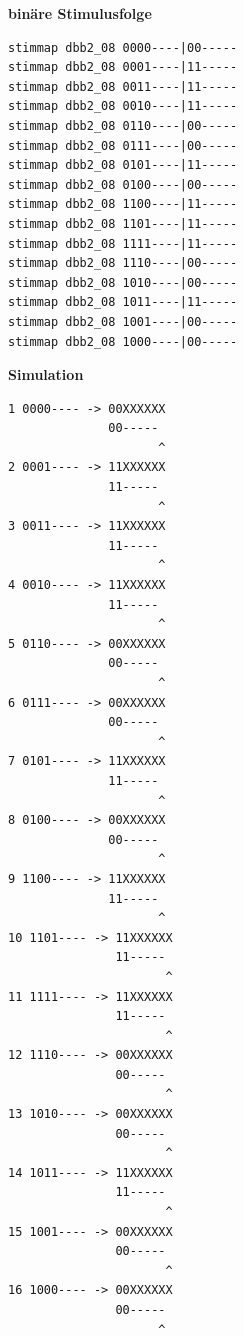 \documentclass[fleqn]{article}
\begin{document}
\textbf{binäre Stimulusfolge}
\begin{lstlisting}
stimmap dbb2_08 0000----|00-----
stimmap dbb2_08 0001----|11-----
stimmap dbb2_08 0011----|11-----
stimmap dbb2_08 0010----|11-----
stimmap dbb2_08 0110----|00-----
stimmap dbb2_08 0111----|00-----
stimmap dbb2_08 0101----|11-----
stimmap dbb2_08 0100----|00-----
stimmap dbb2_08 1100----|11-----
stimmap dbb2_08 1101----|11-----
stimmap dbb2_08 1111----|11-----
stimmap dbb2_08 1110----|00-----
stimmap dbb2_08 1010----|00-----
stimmap dbb2_08 1011----|11-----
stimmap dbb2_08 1001----|00-----
stimmap dbb2_08 1000----|00-----
\end{lstlisting}

\textbf{Simulation}
\begin{lstlisting}
1 0000---- -> 00XXXXXX                                         
              00----- 
                     ^
2 0001---- -> 11XXXXXX                                         
              11----- 
                     ^
3 0011---- -> 11XXXXXX                                         
              11----- 
                     ^
4 0010---- -> 11XXXXXX                                         
              11----- 
                     ^
5 0110---- -> 00XXXXXX                                         
              00----- 
                     ^
6 0111---- -> 00XXXXXX                                         
              00----- 
                     ^
7 0101---- -> 11XXXXXX                                         
              11----- 
                     ^
8 0100---- -> 00XXXXXX                                         
              00----- 
                     ^
9 1100---- -> 11XXXXXX                                         
              11----- 
                     ^
10 1101---- -> 11XXXXXX                                         
               11----- 
                      ^
11 1111---- -> 11XXXXXX                                         
               11----- 
                      ^
12 1110---- -> 00XXXXXX                                         
               00----- 
                      ^
13 1010---- -> 00XXXXXX                                         
               00----- 
                      ^
14 1011---- -> 11XXXXXX                                         
               11----- 
                      ^
15 1001---- -> 00XXXXXX                                         
               00----- 
                      ^
16 1000---- -> 00XXXXXX                                         
               00----- 
                     ^
\end{lstlisting}
\end{document}
